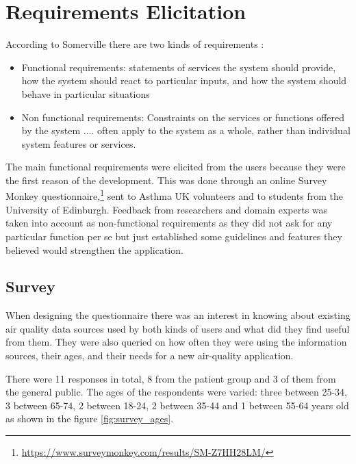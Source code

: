 \section{Requirements Elicitation}
According to Somerville there are two kinds of requirements \cite{Sommerville2010}:
\begin{displayquote}
\begin{itemize}

\item Functional requirements: statements of services the system should provide, how the system should react to particular inputs, and how the system should behave in particular situations

\item Non functional requirements: Constraints on the services or functions offered by the system .... often apply to the system as a whole, rather than individual system features or services.


\end{itemize}
\end{displayquote}

The main functional requirements were elicited from the users because they were the first reason of the development. This was done through an online Survey Monkey questionnaire,\footnote{\url{https://www.surveymonkey.com/results/SM-Z7HH28LM/}} sent to Asthma UK volunteers and to students from the University of Edinburgh. Feedback from researchers and domain experts was taken into account as non-functional requirements as they did not ask for any particular function per se but just established some guidelines and features they believed would strengthen the application.

\subsection{Survey}

When designing the questionnaire there was an interest in knowing about existing air quality data sources used by both kinds of users and what did they find useful from them. They were also queried on how often they were using the information sources, their ages, and their needs for a new air-quality application.

There were 11 responses in total, 8 from the patient group and 3 of them from the general public. The ages of the respondents were varied: three between 25-34, 3 between 65-74, 2 between 18-24, 2 between 35-44 and 1 between 55-64 years old as shown in the figure \ref{fig:survey_ages}. 

